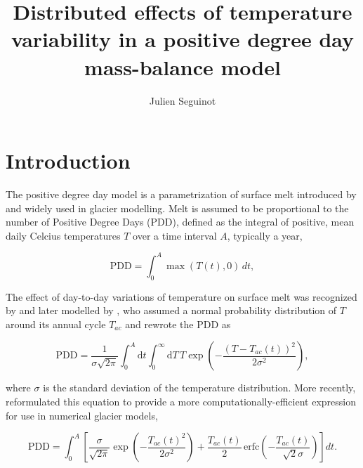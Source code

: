 \documentclass[twocolumn]{igs}
\begin{document}
\title[Temperature variability in a positive degree day model]{Distributed effects of temperature variability in a positive degree day mass-balance model}
\author[J. Seguinot]{Julien Seguinot}

\maketitle


\section{Introduction}

The positive degree day model is a parametrization of surface melt introduced by \citet{braithwaite-1984} and widely used in glacier modelling. Melt is assumed to be proportional to the number of Positive Degree Days (PDD), defined as the integral of positive, mean daily Celcius temperatures $T$ over a time interval $A$, typically a year,

\begin{equation} \label{eq:pdd}
  \mathrm{PDD} = \int_{0}^{A}\max(T(t),0)\,dt,
\end{equation}

The effect of day-to-day variations of temperature on surface melt was recognized by \citet{braithwaite-1984} and later modelled by \citet{reeh-1991}, who assumed a normal probability distribution of $T$ around its annual cycle $T_{ac}$ and rewrote the PDD as

\begin{equation} \label{eq:reeh}
  \mathrm{PDD} = \frac{1}{\sigma\sqrt{2\pi}}
    \int_{0}^{A} \mathrm{d}t
    \int_{0}^{\infty} \mathrm{d}T \,
    T \exp\left({-\frac{(T-T_{ac}(t))^2}{2\sigma^2}}\right),
\end{equation}

where $\sigma$ is the standard deviation of the temperature distribution. More recently, \citet{calov-greve-2005} reformulated this equation to provide a more computationally-efficient expression for use in numerical glacier models,

\begin{equation} \label{eq:calovgreve}
  \mathrm{PDD} = \int_{0}^{A} \left[
    \frac{\sigma}{\sqrt{2\pi}}
    \exp\left({-\frac{T_{ac}(t)^2}{2\sigma^2}}\right)
    +\frac{T_{ac}(t)}{2} \,
    \mathrm{erfc} \left(-\frac{T_{ac}(t)}{\sqrt{2}\sigma}\right)
  \right]dt.
\end{equation}
\end{document}
